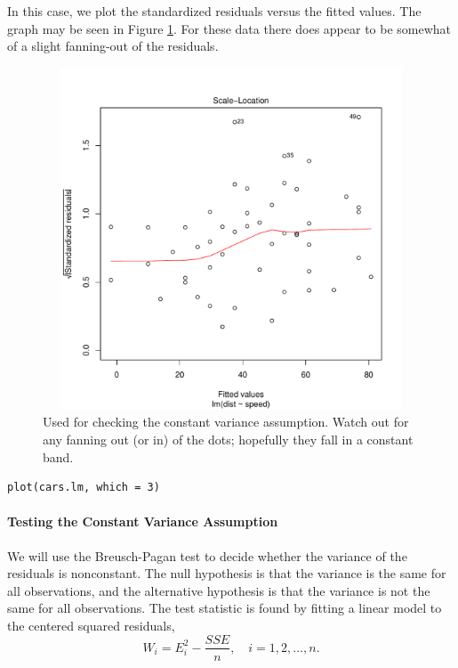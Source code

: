 \documentclass[captions=tableheading]{scrbook}
\begin{document}
In this case, we plot the standardized residuals versus the fitted values. The graph may be seen in Figure \ref{fig:std-resids-fitted-cars}. For these data there does appear to be somewhat of a slight fanning-out of the residuals.

\begin{figure}[ht!]
  \includegraphics[width=5in, height=4in]{img/std-resids-fitted-cars.pdf}
  \caption[Plot of standardized residuals against the fitted values for the \texttt{cars} data]{\small Used for checking the constant variance assumption. Watch out for any fanning out (or in) of the dots; hopefully they fall in a constant band.}
  \label{fig:std-resids-fitted-cars}
\end{figure}


\begin{verbatim}
plot(cars.lm, which = 3)
\end{verbatim}

\paragraph*{Testing the Constant Variance Assumption}

We will use the Breusch-Pagan test to decide whether the variance of the residuals is nonconstant. The null hypothesis is that the variance is the same for all observations, and the alternative hypothesis is that the variance is not the same for all observations. The test statistic is found by fitting a linear model to the centered squared residuals,
\begin{equation}
W_{i} = E_{i}^{2} - \frac{SSE}{n}, \quad i=1,2,\ldots,n.
\end{equation}
\end{document}
